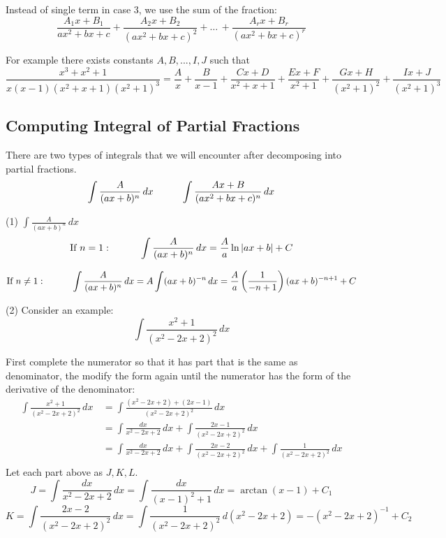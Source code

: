 \documentclass[12pt]{article}
\newcommand\tab[1][1cm]{\hspace*{#1}}
\begin{document}
Instead of single term in case 3, we use the sum of the fraction:
\[
    \frac{A_1x + B_1}{ax^2 + bx + c} + \frac{A_2x + B_2}{(ax^2 + bx + c)^2} + \dots\, + \frac{A_r x + B_r}{(ax^2 + bx + c)^r} 
\]

For example there exists constants $A, B, ..., I, J$ such that
\[
    \frac{x^3 + x^2 + 1}{x(x - 1)(x^2 + x + 1)(x^2 + 1)^3} = \frac{A}{x} + \frac{B}{x - 1} + \frac{Cx + D}{x^2 + x + 1} + \frac{Ex + F}{x^2 + 1} + \frac{Gx + H}{(x^2 + 1)^2} + \frac{Ix + J}{(x^2 + 1)^3} 
\]

\subsection{Computing Integral of Partial Fractions}
There are two types of integrals that we will encounter after decomposing into partial fractions.
\[
    \int \frac{A}{(ax + b)^n} \, dx \textrm{\tab} \int \frac{Ax + B}{(ax^2 + bx + c)^n} \, dx 
\]

(1) $\int \frac{A}{(ax + b)^n} \, dx $
\[
    \textrm{If } n = 1: \textrm{\tab} \int \frac{A}{(ax + b)^n} \, dx  = \frac{A}{a} \ln |ax + b| + C
\]

\[
    \textrm{If } n \neq 1: \textrm{\tab} \int \frac{A}{(ax + b)^n} \, dx  = A\int (ax + b)^{-n} \, dx = \frac{A}{a} \left( \frac{1}{-n +1} \right) (ax + b)^{-n + 1} + C
\]

(2) Consider an example:
\[
    \int \frac{x^2 + 1}{(x^2 - 2x + 2)^2} \, dx 
\]

First complete the numerator so that it has part that is the same as denominator, the modify the form again until the numerator has
the form of the derivative of the denominator:
\begin{align*} 
    \int \frac{x^2 + 1}{(x^2 - 2x + 2)^2} \, dx\, &= \int \frac{(x^2 - 2x + 2) + (2x - 1)}{(x^2 - 2x + 2)^2} \, dx \\ 
    &= \int \frac{dx}{x^2 - 2x + 2} \, dx + \int \frac{2x - 1}{(x^2 - 2x + 2)^2} \, dx\, \\ 
    &= \int \frac{dx}{x^2 - 2x + 2} \, dx+ \int \frac{2x - 2}{(x^2 - 2x + 2)^2} \, dx + \int \frac{1}{(x^2 - 2x + 2)^2} \, dx \\
\end{align*}
Let each part above as $J, K, L$.
\[
    J =  \int \frac{dx}{x^2 - 2x + 2} \, dx = \int \frac{dx}{(x - 1)^2 + 1} \, dx = \arctan (x - 1) + C_1
\]
\[
    K = \int \frac{2x - 2}{(x^2 - 2x + 2)^2} \, dx = \int \frac{1}{(x^2 - 2x + 2)^2} \, d(x^2 - 2x + 2) = -(x^2 - 2x + 2)^{ - 1} + C_2
\]
\end{document}
